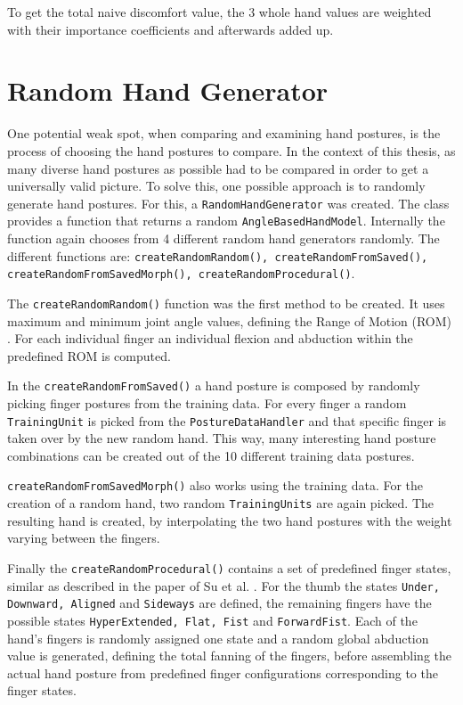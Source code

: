 To get the total naive discomfort value, the 3 whole hand values are weighted with their importance coefficients and afterwards added up.

\section{Random Hand Generator}

One potential weak spot, when comparing and examining hand postures, is the process of choosing the hand postures to compare. In the context of this thesis, as many diverse hand postures as possible had to be compared in order to get a universally valid picture. To solve this, one possible approach is to randomly generate hand postures. 
For this, a \texttt{RandomHandGenerator} was created. The class provides a function that returns a random \texttt{AngleBasedHandModel}. Internally the function again chooses from 4 different random hand generators randomly. The different functions are: \texttt{createRandomRandom(), createRandomFromSaved(), createRandomFromSavedMorph(), createRandomProcedural()}. 

The \texttt{createRandomRandom()} function was the first method to be created. It uses maximum and minimum joint angle values, defining the Range of Motion (ROM) \cite{apostolico2014postural}. For each individual finger an individual flexion and abduction within the predefined ROM is computed.

In the \texttt{createRandomFromSaved()} a hand posture is composed by randomly picking finger postures from the training data. For every finger a random \texttt{TrainingUnit} is picked from the \texttt{PostureDataHandler} and that specific finger is taken over by the new random hand. This way, many interesting hand posture combinations can be created out of the 10 different training data postures.

\texttt{createRandomFromSavedMorph()} also works using the training data. For the creation of a random hand, two random \texttt{TrainingUnits} are again picked. The resulting hand is created, by interpolating the two hand postures with the weight varying between the fingers. 

Finally the \texttt{createRandomProcedural()} contains a set of predefined finger states, similar as described in the paper of Su et al. \cite{su1994logical}. For the thumb the states \texttt{Under, Downward, Aligned} and \texttt{Sideways} are defined, the remaining fingers have the possible states \texttt{HyperExtended, Flat, Fist} and \texttt{ForwardFist}. Each of the hand's fingers is randomly assigned one state and a random global abduction value is generated, defining the total fanning of the fingers, before assembling the actual hand posture from predefined finger configurations corresponding to the finger states.

